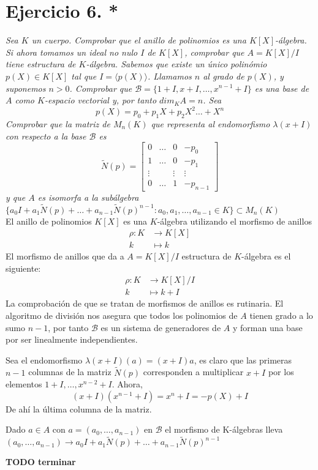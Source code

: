 \section{Ejercicio 6. *} \emph{Sea \(K\) un cuerpo. Comprobar que el anillo de polinomios
es una \(K[X]\)-álgebra. Si ahora tomamos un ideal no nulo \(I\) de
\(K[X]\), comprobar que \(A = K[X]/I\) tiene estructura de
\(K\)-álgebra. Sabemos que existe un único polinómio \(p(X) \in K[X]\) tal que
\(I = \langle p(X) \rangle\). Llamamos \(n\) al grado de \(p(X)\), y suponemos
\(n > 0\). Comprobar que \(\mathcal{B} = \{1 + I, x + I, \dots, x^{n-1} + I\}\)
es una base de \(A\) como \(K\)-espacio vectorial y, por tanto \(dim_KA = n\).
Sea}
\[
p(X) = p_0 + p_1X + p_2X^2\dots + X^n
\]
\emph{Comprobar que la matriz de \(M_n(K)\) que representa al endomorfismo \(\lambda(x
+ I)\) con respecto a la base \(\mathcal{B}\) es}
\[
\tilde{N}(p) = \begin{bmatrix}
    0       &  \dots  & 0 & -p_0 \\
    1       &  \dots  & 0 & -p_1 \\
    \vdots &  & \vdots & \vdots \\
    0       &  \dots  & 1 & -p_{n-1}
\end{bmatrix}
\]
\emph{y que \(A\) es isomorfa a la subálgebra \(\{a_0I + a_1\tilde{N}(p) + \dots +
  a_{n-1}\tilde{N}(p)^{n-1} : a_0, a_1, \dots, a_{n-1} \in K\} \subset M_n(K)\)}\\

El anillo de polinomios \(K[X]\) es una \(K\)-álgebra utilizando el morfismo de
anillos
\[
\begin{aligned}
  \rho: K &\to K[X]\\
        k &\mapsto k
\end{aligned}
\]
El morfismo de anillos que da a \(A = K[X]/I\) estructura de \(K\)-álgebra es el
siguiente:
\[
\begin{aligned}
  \rho: K &\to K[X]/I \\
  k &\mapsto k + I
\end{aligned}
\]
La comprobación de que se tratan de morfismos de anillos es rutinaria.
El algoritmo de división nos asegura que todos los polinomios de \(A\) tienen
grado a lo sumo \(n-1\), por tanto \(\mathcal{B}\) es un sistema de generadores
de \(A\) y forman una base por ser linealmente independientes.

Sea el endomorfismo \(\lambda (x+I)(a) = (x+I)a\), es claro que las primeras
\(n-1\) columnas de la matriz \(\tilde{N}(p)\) corresponden a multiplicar \(x +
I\) por los elementos \(1 + I, \dots, x^{n-2} + I\). Ahora,
\[
(x + I)(x^{n-1} + I) = x^n + I = -p(X) + I
\]
De ahí la última columna de la matriz.

Dado \(a \in A\) con \(a = (a_0, \dots, a_{n-1})\) en \(\mathcal{B}\) el
morfismo de K-álgebras lleva \((a_0,\dots,a_{n-1}) \to a_0I + a_1\tilde{N}(p) + \dots +
  a_{n-1}\tilde{N}(p)^{n-1} \)

\textbf{TODO terminar}
